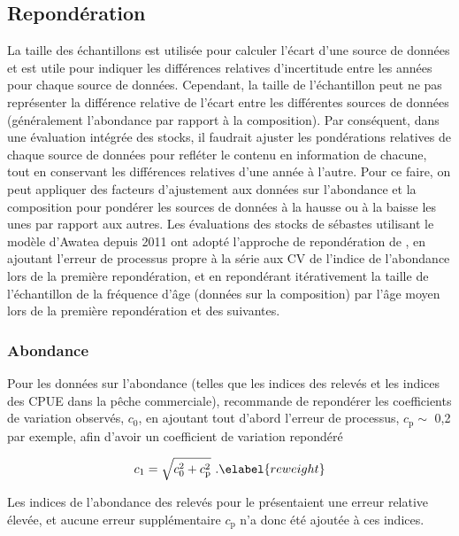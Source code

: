 \documentclass[11pt]{book}
\def\vsd{\vspace*{1ex}}     %
\renewcommand{\eb}{\vsd \vsd \begin{eqnarray}}
\renewcommand{\ee}{\end{eqnarray} \vsd }
\begin{document}
\subsection{Repond\'{e}ration} \label{ss:reweight}

La taille des \'{e}chantillons est utilis\'{e}e pour calculer l'\'{e}cart d'une source de donn\'{e}es et est utile pour indiquer les diff\'{e}rences relatives d'incertitude entre les ann\'{e}es pour chaque source de donn\'{e}es.
Cependant, la taille de l'\'{e}chantillon peut ne pas repr\'{e}senter la diff\'{e}rence relative de l'\'{e}cart entre les diff\'{e}rentes sources de donn\'{e}es (g\'{e}n\'{e}ralement l'abondance par rapport \`{a} la composition).
Par cons\'{e}quent, dans une \'{e}valuation int\'{e}gr\'{e}e des stocks, il faudrait ajuster les pond\'{e}rations relatives de chaque source de donn\'{e}es pour refl\'{e}ter le contenu en information de chacune, tout en conservant les diff\'{e}rences relatives d'une ann\'{e}e \`{a} l'autre.
Pour ce faire, on peut appliquer des facteurs d'ajustement aux donn\'{e}es sur l'abondance et la composition pour pond\'{e}rer les sources de donn\'{e}es \`{a} la hausse ou \`{a} la baisse les unes par rapport aux autres.
Les \'{e}valuations des stocks de s\'{e}bastes utilisant le mod\`{e}le d'Awatea depuis 2011 ont adopt\'{e} l'approche de repond\'{e}ration de \citet{Francis:2011}, en ajoutant l'erreur de processus propre \`{a} la s\'{e}rie aux CV de l'indice de l'abondance lors de la premi\`{e}re repond\'{e}ration, et en repond\'{e}rant it\'{e}rativement la taille de l'\'{e}chantillon de la fr\'{e}quence d'\^{a}ge (donn\'{e}es sur la composition) par l'\^{a}ge moyen lors de la premi\`{e}re repond\'{e}ration et des suivantes.

\subsubsection{Abondance} \label{sss:rwt_abund}

Pour les donn\'{e}es sur l'abondance (telles que les indices des relev\'{e}s et les indices des CPUE dans la p\^{e}che commerciale), \citet{Francis:2011} recommande de repond\'{e}rer les coefficients de variation observ\'{e}s, $c_0$, en ajoutant tout d'abord l'erreur de processus, $c_\text{p} \sim$ 0,2 par exemple, afin d'avoir un coefficient de variation repond\'{e}r\'{e}

\eb
c_1 = \sqrt{c_0^2 + c_\text{p}^2}~. \elabel{reweight}
\ee

Les indices de l'abondance des relev\'{e}s pour le \spc{} pr\'{e}sentaient une erreur relative \'{e}lev\'{e}e, et aucune erreur suppl\'{e}mentaire $c_\text{p}$ n'a donc \'{e}t\'{e} ajout\'{e}e \`{a} ces indices.
\end{document}
